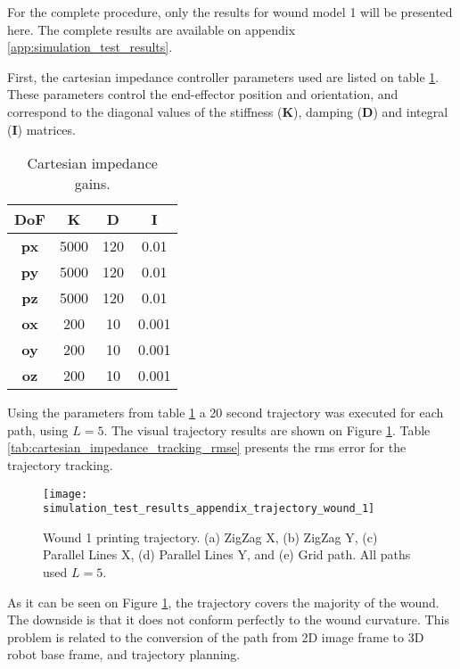 For the complete procedure, only the results for wound model 1 will be presented here. The complete results are available on appendix \ref{app:simulation_test_results}.

First, the cartesian impedance controller parameters used are listed on table \ref{tab:cartesian_impedance_gains}. These parameters control the end-effector position and orientation, and correspond to the diagonal values of the stiffness ($\boldsymbol{K}$), damping ($\boldsymbol{D}$) and integral ($\boldsymbol{I}$) matrices.

\begin{table}[htbp]
    \centering
    \caption[Cartesian impedance gains.]{Cartesian impedance gains.}
    \begin{tabular}{c|c|c|c}
         \toprule
         \textbf{DoF} & \textbf{K} & \textbf{D} & \textbf{I}  \\
         \midrule
         \textbf{px} & 5000 & 120 & 0.01 \\ 
         \textbf{py} & 5000 & 120 & 0.01 \\ 
         \textbf{pz} & 5000 & 120 & 0.01 \\ 
         \textbf{ox} & 200 & 10 & 0.001 \\ 
         \textbf{oy} & 200 & 10 & 0.001 \\ 
         \textbf{oz} & 200 & 10 & 0.001 \\ 
         \bottomrule
    \end{tabular}
    \label{tab:cartesian_impedance_gains}
\end{table}

Using the parameters from table \ref{tab:cartesian_impedance_gains} a 20 second trajectory was executed for each path, using $L = 5$. The visual trajectory results are shown on Figure \ref{fig:simulation_test_results_toolpath_wound_1}. Table \ref{tab:cartesian_impedance_tracking_rmse} presents the \gls{rms} error for the trajectory tracking.

\begin{figure}[htbp]
	\centering
	\texttt{[image: simulation\_test\_results\_appendix\_trajectory\_wound\_1]}
	\caption[Wound 1 printing trajectory.]{Wound 1 printing trajectory. (a) ZigZag X, (b) ZigZag Y, (c) Parallel Lines X, (d) Parallel Lines Y, and (e) Grid path. All paths used $L = 5$.}
    \label{fig:simulation_test_results_toolpath_wound_1}
\end{figure}

As it can be seen on Figure \ref{fig:simulation_test_results_toolpath_wound_1}, the trajectory covers the majority of the wound. The downside is that it does not conform perfectly to the wound curvature. This problem is related to the conversion of the path from 2D image frame to 3D robot base frame, and trajectory planning.

